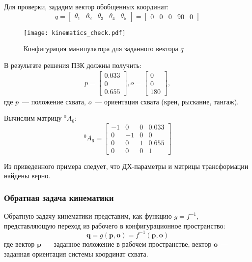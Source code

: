 Для проверки, зададим вектор обобщенных координат:
\begin{equation}
	q =
	\begin{bmatrix}
	\theta_1 & \theta_2 & \theta_3 & \theta_4 & \theta_5
	\end{bmatrix}
	=
	\begin{bmatrix}
	0 & 0 & 0 & 90 & 0
	\end{bmatrix}
\end{equation}

\begin{figure}[h]
	\centering
	\texttt{[image: kinematics\_check.pdf]}
	\caption{Конфигурация манипулятора для заданного вектора $q$}
	\label{kinematics_check}
\end{figure}

В результате решения ПЗК должны получить:
\begin{align*}
	p = 
	\begin{bmatrix}
		0.033\\
		0\\
		0.655 
	\end{bmatrix},
	o =
	\begin{bmatrix}
		0\\
		0\\
		180
	\end{bmatrix}, 
\end{align*}
где $p$~--- положение схвата, $o$~--- ориентация схвата (крен, рыскание, тангаж).

Вычислим матрицу $^0A_6$:
\begin{equation}
	^0A_6 = 
	\left[\begin{matrix}-1 & 0 & 0 & 0.033\\0 & -1 & 0 & 0\\0 & 0 & 1 & 0.655\\0 & 0 & 0 & 1\end{matrix}\right]
\end{equation}

Из приведенного примера следует, что ДХ-параметры и матрицы трансформации найдены верно.

\subsubsection{Обратная задача кинематики}\label{part_kinematics_inverse}

Обратную задачу кинематики представим, как функцию $g = f^{-1}$, представляющую переход из рабочего в конфигурационное пространство:
\begin{equation}
\textbf{q} = g(\textbf{p}, \textbf{o}) = f^{-1}(\textbf{p}, \textbf{o})
\end{equation}
где вектор $\textbf{p}$~--- заданное положение в рабочем пространстве, вектор $\textbf{o}$~--- заданная ориентация системы координат схвата.

